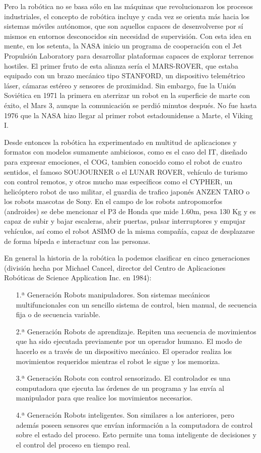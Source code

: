 Pero la robótica no se basa sólo en las máquinas que revolucionaron los procesos industriales, el concepto de robótica incluye y cada vez se orienta más hacia los sistemas móviles autónomos, que son aquellos capaces de desenvolverse por sí mismos en entornos desconocidos sin necesidad de supervisión. Con esta idea en mente, en los setenta, la NASA inicio un programa de cooperación con el Jet Propulsión Laboratory para desarrollar plataformas capaces de explorar terrenos hostiles. El primer fruto de esta alianza sería el MARS-ROVER, que estaba equipado con un brazo mecánico tipo STANFORD, un dispositivo telemétrico láser, cámaras estéreo y sensores de proximidad. Sin embargo, fue la Unión Soviética en 1971 la primera en aterrizar un robot en la superficie de marte con éxito, el Mars 3, aunque la comunicación se perdió minutos después. No fue hasta 1976 que la NASA hizo llegar al primer robot estadounidense a Marte, el Viking I.

Desde entonces la robótica ha experimentado en multitud de aplicaciones y formatos con modelos sumamente ambiciosos, como es el caso del IT, diseñado para expresar emociones, el COG, tambien conocido como el robot de cuatro sentidos, el famoso SOUJOURNER o el LUNAR ROVER, vehículo de turismo con control remotos, y otros mucho mas específicos como el CYPHER, un helicóptero robot de uso militar, el guardia de trafico japonés ANZEN TARO o los robots mascotas de Sony. En el campo de los robots antropomorfos (androides) se debe mencionar el P3 de Honda que mide 1.60m, pesa 130 Kg y es capaz de subir y bajar escaleras, abrir puertas, pulsar interruptores y empujar vehículos, así como el robot ASIMO de la misma compañía, capaz de desplazarse de forma bípeda e interactuar con las personas.

En general la historia de la robótica la podemos clasificar en cinco generaciones (división hecha por Michael Cancel, director del Centro de Aplicaciones Robóticas de Science Application Inc. en 1984): 
\begin{enumerate}[1.ª Generación]
	\item[1.ª Generación] Robots manipuladores. Son sistemas mecánicos multifuncionales con un sencillo sistema de control, bien manual, de secuencia fija o de secuencia variable.
	\item[2.ª Generación] Robots de aprendizaje. Repiten una secuencia de movimientos que ha sido ejecutada previamente por un operador humano. El modo de hacerlo es a través de un dispositivo mecánico. El operador realiza los movimientos requeridos mientras el robot le sigue y los memoriza.
	\item[3.ª Generación] Robots con control sensorizado. El controlador es una computadora que ejecuta las órdenes de un programa y las envía al manipulador para que realice los movimientos necesarios.
	\item[4.ª Generación] Robots inteligentes. Son similares a los anteriores, pero además poseen sensores que envían información a la computadora de control sobre el estado del proceso. Esto permite una toma inteligente de decisiones y el control del proceso en tiempo real.
\end{enumerate}


